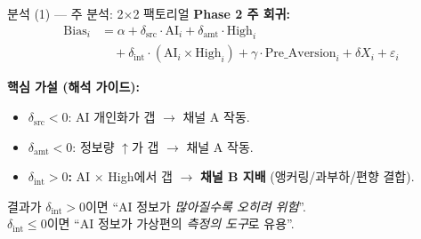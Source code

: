 \documentclass[aspectratio=169]{beamer}
\begin{document}
\begin{frame}{분석 (1) --- 주 분석: 2$\times$2 팩토리얼}
  \textbf{Phase 2 주 회귀:}
  \begin{align*}
    \mathrm{Bias}_i &= \alpha + \delta_{\text{src}} \cdot \mathrm{AI}_i + \delta_{\text{amt}} \cdot \mathrm{High}_i \\
                    &\quad + \delta_{\text{int}} \cdot (\mathrm{AI}_i \times \mathrm{High}_i) + \gamma \cdot \mathrm{Pre\_Aversion}_i + \delta X_i + \varepsilon_i
  \end{align*}

  \vspace{0.3em}
  \textbf{핵심 가설 (해석 가이드):}
  \begin{itemize}\itemsep0.15em
    \item $\delta_{\text{src}} < 0$: AI 개인화가 갭  $\rightarrow$ 채널 A 작동.
    \item $\delta_{\text{amt}} < 0$: 정보량 $\uparrow$가 갭  $\rightarrow$ 채널 A 작동.
    \item \textbf{$\delta_{\text{int}} > 0$:} AI $\times$ High에서 갭  $\rightarrow$ \textbf{채널 B 지배} (앵커링/과부하/편향 결합).
  \end{itemize}

  \vspace{0.4em}
   결과가 $\delta_{\text{int}} > 0$이면 ``AI 정보가 \emph{많아질수록 오히려 위험}''.\\
  $\delta_{\text{int}} \leq 0$이면 ``AI 정보가 가상편의 \emph{측정의 도구}로 유용''.
\end{frame}
\end{document}
